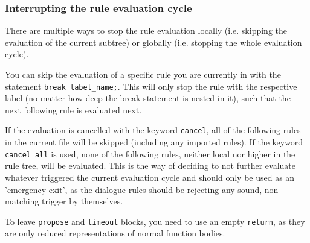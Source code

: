 

\subsubsection{Interrupting the rule evaluation cycle}

%
There are multiple ways to stop the rule evaluation locally (i.e. skipping the
evaluation of the current subtree) or globally (i.e. stopping the whole
evaluation cycle).

You can skip the evaluation of a specific rule you are currently in with the
statement \texttt{break label\_name;}. This will only stop the rule with the
respective label (no matter how deep the break statement is nested in it), such
that the next following rule is evaluated next.

%
If the evaluation is cancelled with the keyword \texttt{cancel}, all of the
following rules in the current file will be skipped (including any imported
rules). If the keyword \texttt{cancel\_all} is used, none of the following
rules, neither local nor higher in the rule tree, will be evaluated. This is
the \vonda way of deciding to not further evaluate whatever triggered the current
evaluation cycle and should only be used as an 'emergency exit', as the
dialogue rules should be rejecting any sound, non-matching trigger by
themselves.


To leave \texttt{propose} and \texttt{timeout} blocks, you need to use an empty
\texttt{return}, as they are only reduced representations of normal function
bodies.

